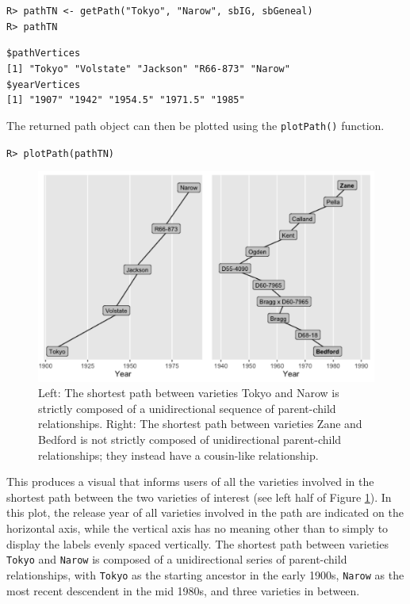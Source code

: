 \documentclass[11pt,a4paper,oldfontcommands,openany]{memoir}
\DeclareRobustCommand{\mybox}[2][gray!15]{%
\begin{tcolorbox}[   %
        breakable,
        left=0pt,
        right=0pt,
        top=0pt,
        bottom=0pt,
        colback=#1,
        colframe=#1,
        width=\dimexpr\textwidth\relax, 
        enlarge left by=0mm,
        boxsep=5pt,
        arc=0pt,outer arc=0pt,
        ]
        #2
\end{tcolorbox}
}
\numberwithin{equation}{section} %
\newcommand{\code}[1]{{\texttt{#1}}}
\begin{document}
\mybox{
\texttt{R> pathTN <- getPath("Tokyo", "Narow", sbIG, sbGeneal)}\\
\texttt{R> pathTN}
}

\mybox[green!10]{
\texttt{\$pathVertices}\\
\texttt{[1] "Tokyo"    "Volstate" "Jackson"  "R66-873"  "Narow"}\\   

\texttt{\$yearVertices}\\
\texttt{[1] "1907"   "1942"   "1954.5" "1971.5" "1985"}
}

The returned path object can then be plotted using the \code{plotPath()} function.

\mybox{
\texttt{R> plotPath(pathTN)}
}

\begin{figure}[h]
    \begin{framed}
    \centering
    \includegraphics[width=\textwidth]{pathTNZB}
    \end{framed}
    \caption{Left: The shortest path between varieties Tokyo and Narow is strictly composed of a unidirectional sequence of parent-child relationships. Right: The shortest path between varieties Zane and Bedford is not strictly composed of unidirectional parent-child relationships; they instead have a cousin-like relationship.}
    \label{fig:pathTNZB}
\end{figure}

This produces a visual that informs users of all the varieties involved in the shortest path between the two varieties of interest (see left half of Figure \ref{fig:pathTNZB}). In this plot, the release year of all varieties involved in the path are indicated on the horizontal axis, while the vertical axis has no meaning other than to simply to display the labels evenly spaced vertically. The shortest path between varieties \code{Tokyo} and \code{Narow} is composed of a unidirectional series of parent-child relationships, with \code{Tokyo} as the starting ancestor in the early 1900s, \code{Narow} as the most recent descendent in the mid 1980s, and three varieties in between.
\end{document}
